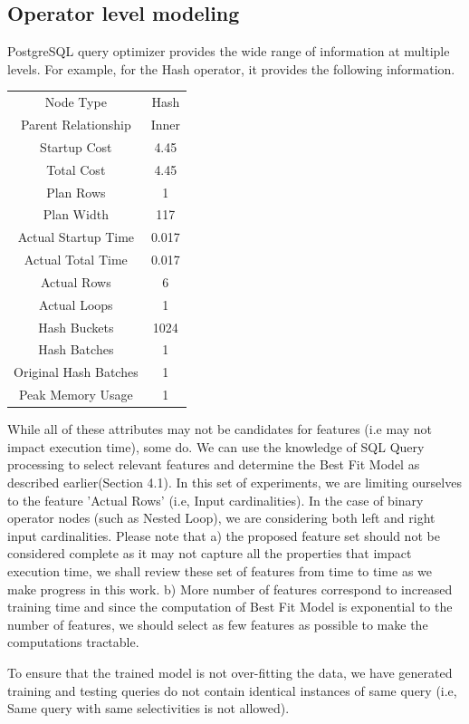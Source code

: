\documentclass{article}
\begin{document}
\begin{multicols}{2}
	\subsection{Operator level modeling}
	PostgreSQL query optimizer provides the wide range of information at multiple levels. For example, 
	for the Hash operator, it provides the following information.
	
	\begin{center}
	\begin{tabular}{ |c|c| } 
	 \hline
		Node Type& Hash \\
		Parent Relationship& Inner\\
		Startup Cost& 4.45\\
		Total Cost& 4.45\\
		Plan Rows& 1\\
		Plan Width& 117\\
		Actual Startup Time& 0.017\\
		Actual Total Time& 0.017\\
		Actual Rows& 6\\
		Actual Loops& 1\\
		Hash Buckets& 1024\\
		Hash Batches& 1\\
		Original Hash Batches& 1\\
		Peak Memory Usage& 1\\
	 \hline
	\end{tabular}
	\end{center}
	
	While all of these attributes may not be candidates for features (i.e may not impact execution time),	some do. We can use the knowledge of SQL Query processing to select relevant features and determine the Best Fit Model as described earlier(Section 4.1). In this set of experiments, we are limiting
	ourselves to the feature 'Actual Rows' (i.e, Input cardinalities). In the case of binary operator nodes (such as
	Nested Loop), we are considering both left and right input cardinalities. Please note that 
	a) the proposed feature set should not be considered complete as it may not capture all the properties that impact execution time, we shall review these set of features from time to time as we make progress in this work.  b) More number of features 	correspond to increased training time and since the computation of Best Fit Model is exponential to the number of features, we should select as few features as possible to make the computations tractable. 
	
	To ensure that the trained model is not over-fitting the data, we have generated training and testing queries do not contain identical instances of same query (i.e, Same query with same selectivities is not allowed). 
	

\end{multicols}
\end{document}
